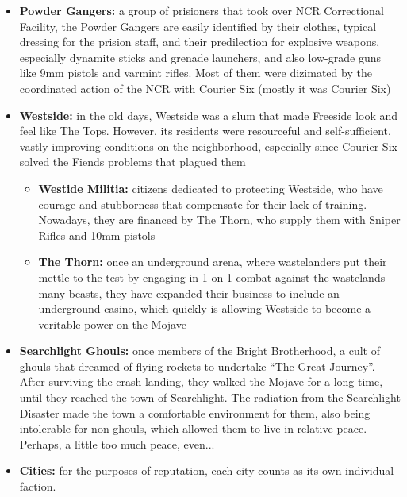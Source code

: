 \documentclass[11pt]{article} %
\begin{document}
\begin{itemize}
\item \textbf{Powder Gangers:} a group of prisioners that took over NCR Correctional Facility, the Powder Gangers are easily identified by their clothes, typical dressing for the prision staff, and their predilection for explosive weapons, especially dynamite sticks and grenade launchers, and also low-grade guns like 9mm pistols and varmint rifles. Most of them were dizimated by the coordinated action of the NCR with Courier Six (mostly it was Courier Six)

\item \textbf{Westside:} in the old days, Westside was a slum that made Freeside look and feel like The Tops. However, its residents were resourceful and self-sufficient, vastly improving conditions on the neighborhood, especially since Courier Six solved the Fiends problems that plagued them

\begin{itemize}
\item \textbf{Westide Militia:} citizens dedicated to protecting Westside, who have courage and stubborness that compensate for their lack of training. Nowadays, they are financed by The Thorn, who supply them with Sniper Rifles and 10mm pistols

\item \textbf{The Thorn:} once an underground arena, where wastelanders put their mettle to the test by engaging in 1 on 1 combat against the wastelands many beasts, they have expanded their business to include an underground casino, which quickly is allowing Westside to become a veritable power on the Mojave
\end{itemize} 

\item \textbf{Searchlight Ghouls:} once members of the Bright Brotherhood, a cult of ghouls that dreamed of flying rockets to undertake ``The Great Journey''. After surviving the crash landing, they walked the Mojave for a long time, until they reached the town of Searchlight. The radiation from the Searchlight Disaster made the town a comfortable environment for them, also being intolerable for non-ghouls, which allowed them to live in relative peace. Perhaps, a little too much peace, even...

\item \textbf{Cities:} for the purposes of reputation, each city counts as its own individual faction.

\end{itemize}
\end{document}
